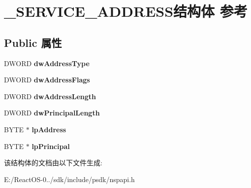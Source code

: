 \hypertarget{struct___s_e_r_v_i_c_e___a_d_d_r_e_s_s}{}\section{\+\_\+\+S\+E\+R\+V\+I\+C\+E\+\_\+\+A\+D\+D\+R\+E\+S\+S结构体 参考}
\label{struct___s_e_r_v_i_c_e___a_d_d_r_e_s_s}
\subsection*{Public 属性}
\begin{DoxyCompactItemize}
\item 
\mbox{\label{struct___s_e_r_v_i_c_e___a_d_d_r_e_s_s_a33285c3b1706f0b728875f2d83bd5b03}} 
D\+W\+O\+RD {\bfseries dw\+Address\+Type}
\item 
\mbox{\label{struct___s_e_r_v_i_c_e___a_d_d_r_e_s_s_a03c8c6068271aafaf593f6f6b5649013}} 
D\+W\+O\+RD {\bfseries dw\+Address\+Flags}
\item 
\mbox{\label{struct___s_e_r_v_i_c_e___a_d_d_r_e_s_s_a3aab994798a59dab05aaca642e746a3a}} 
D\+W\+O\+RD {\bfseries dw\+Address\+Length}
\item 
\mbox{\label{struct___s_e_r_v_i_c_e___a_d_d_r_e_s_s_abcb2db4ca0e766c64e741b75909b796f}} 
D\+W\+O\+RD {\bfseries dw\+Principal\+Length}
\item 
\mbox{\label{struct___s_e_r_v_i_c_e___a_d_d_r_e_s_s_ab8fa82abe188617f608ae8ade364135e}} 
B\+Y\+TE $\ast$ {\bfseries lp\+Address}
\item 
\mbox{\label{struct___s_e_r_v_i_c_e___a_d_d_r_e_s_s_a6c460aa4321a4ee9c6cbda72046256db}} 
B\+Y\+TE $\ast$ {\bfseries lp\+Principal}
\end{DoxyCompactItemize}


该结构体的文档由以下文件生成\+:\begin{DoxyCompactItemize}
\item 
E\+:/\+React\+O\+S-\/0../sdk/include/psdk/nspapi.\+h\end{DoxyCompactItemize}
